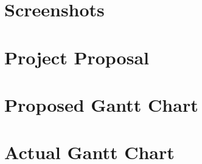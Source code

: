 \begin{appendices}
\titleformat{\chapter}[hang]{\normalfont\LARGE\bfseries\raggedright}{\chaptertitlename\ \thechapter}{1em}{}
\titlespacing*{\chapter}{0pt}{0pt}{40pt}
\titleformat{\section}{\normalfont\Large\bfseries\raggedright}{\thesection}{1em}{}


















\chapter{Screenshots}



\chapter{Project Proposal}


\chapter{Proposed Gantt Chart}

\chapter{Actual Gantt Chart}

\end{appendices}